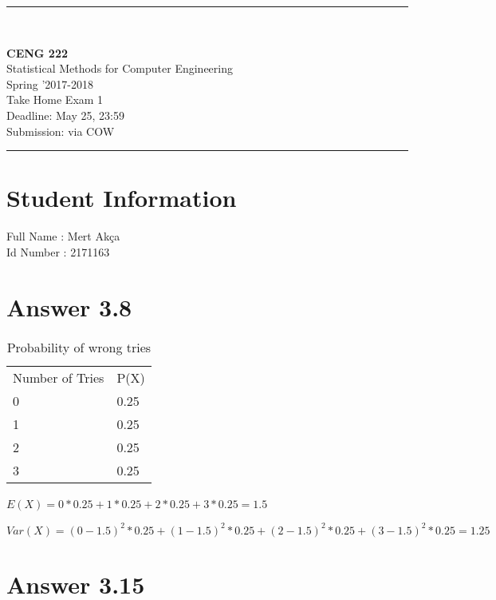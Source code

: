 \documentclass[12pt]{article}
\newcommand{\HRule}{\rule{\linewidth}{1mm}}
\begin{document}
\noindent
\HRule \\[3mm]
\begin{flushright}

                                         \LARGE \textbf{CENG 222}  \\[4mm]
                                         \Large Statistical Methods for Computer Engineering \\[4mm]
                                        \normalsize      Spring '2017-2018 \\
                                           \Large   Take Home Exam 1 \\
                    \normalsize Deadline: May 25, 23:59 \\
                    \normalsize Submission: via COW
\end{flushright}
\HRule

\section*{Student Information }
Full Name : Mert Akça  \\
Id Number : 2171163 \\

\section*{Answer 3.8}

\begin{table}[h]
\centering
\caption{Probability of wrong tries}
\label{my-label}
\begin{tabular}{ll}
Number of Tries & P(X) \\
0               & 0.25 \\
1               & 0.25 \\
2               & 0.25 \\
3               & 0.25
\end{tabular}
\end{table}

\noindent $E(X) = 0*0.25+1*0.25+2*0.25+3*0.25= 1.5$\ 

\noindent $Var(X) = (0-1.5)^2*0.25+(1-1.5)^2*0.25+(2-1.5)^2*0.25+(3-1.5)^2*0.25= 1.25$



\section*{Answer 3.15}
\end{document}
